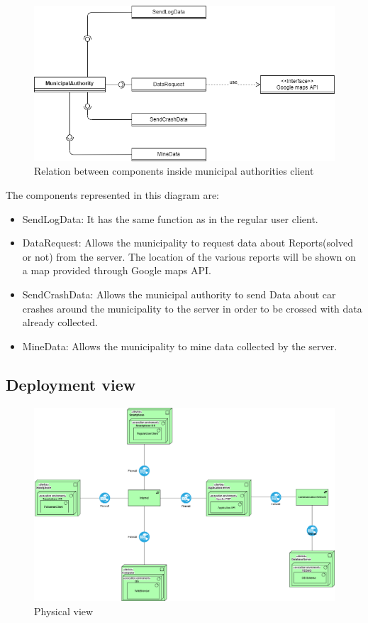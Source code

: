 \begin{figure}[H]
	\centering
	\includegraphics[scale=0.7]{Images/MunicipalAuthoritiesClient}
	\caption{Relation between components inside municipal authorities client}
\end{figure}
The components represented in this diagram are:
\begin{itemize}
	\item SendLogData: It has the same function as in the regular user client.
	\item DataRequest: Allows the municipality to request data about Reports(solved or not) from the server.
	The location of the various reports will be shown on a map provided through Google maps API.
	\item SendCrashData: Allows the municipal authority to send Data about car crashes around the municipality to the server in order to be crossed with data already collected.
	\item MineData: Allows the municipality to mine data collected by the server.
\end{itemize}

\newpage
\subsection{Deployment view}

\begin{figure}[h!]
	\centering
	\includegraphics[width=\textwidth]{Images/physical_view}
	\caption{Physical view}
\end{figure}

